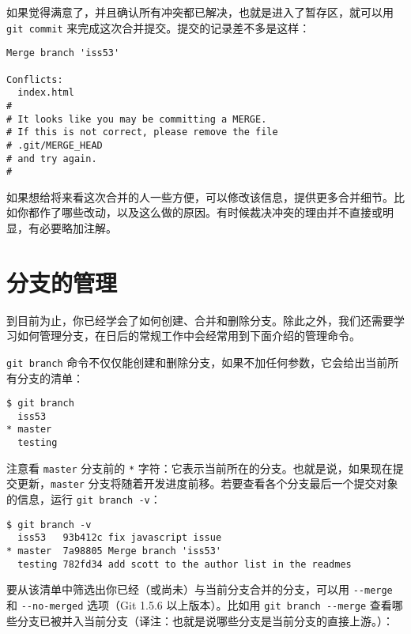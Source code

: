 \documentclass[a4paper]{book}
\begin{document}
如果觉得满意了，并且确认所有冲突都已解决，也就是进入了暂存区，就可以用 \texttt{git commit} 来完成这次合并提交。提交的记录差不多是这样：

\begin{shaded}\begin{verbatim}
Merge branch 'iss53'

Conflicts:
  index.html
#
# It looks like you may be committing a MERGE.
# If this is not correct, please remove the file
# .git/MERGE_HEAD
# and try again.
#
\end{verbatim}\end{shaded}

如果想给将来看这次合并的人一些方便，可以修改该信息，提供更多合并细节。比如你都作了哪些改动，以及这么做的原因。有时候裁决冲突的理由并不直接或明显，有必要略加注解。

\section{分支的管理}

到目前为止，你已经学会了如何创建、合并和删除分支。除此之外，我们还需要学习如何管理分支，在日后的常规工作中会经常用到下面介绍的管理命令。

\texttt{git branch} 命令不仅仅能创建和删除分支，如果不加任何参数，它会给出当前所有分支的清单：

\begin{shaded}\begin{verbatim}
$ git branch
  iss53
* master
  testing
\end{verbatim}\end{shaded}

注意看 \texttt{master} 分支前的 \texttt{*} 字符：它表示当前所在的分支。也就是说，如果现在提交更新，\texttt{master} 分支将随着开发进度前移。若要查看各个分支最后一个提交对象的信息，运行 \texttt{git branch -v}：

\begin{shaded}\begin{verbatim}
$ git branch -v
  iss53   93b412c fix javascript issue
* master  7a98805 Merge branch 'iss53'
  testing 782fd34 add scott to the author list in the readmes
\end{verbatim}\end{shaded}

要从该清单中筛选出你已经（或尚未）与当前分支合并的分支，可以用 \texttt{-{}-merge} 和 \texttt{-{}-no-merged} 选项（Git 1.5.6 以上版本）。比如用 \texttt{git branch -{}-merge} 查看哪些分支已被并入当前分支（译注：也就是说哪些分支是当前分支的直接上游。）：
\end{document}
